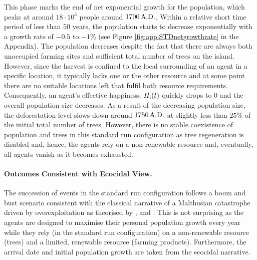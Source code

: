 This phase marks the end of net exponential growth for the population, which peaks at around $18\cdot 10^3$ people around $1700\, {\rm A.D.}$.
Within a relative short time period of less than $50$ years, the population starts to decrease exponentially with a growth rate of $-0.5$ to $-1\%$ (see Figure \ref{fig:app:STDnetgrowthrate} in the Appendix).
The population decreases despite the fact that there are always both unoccupied farming sites and sufficient total number of trees on the island.
However, since the harvest is confined to the local surrounding of an agent in a specific location, it typically lacks one or the other resource and at some point there are no suitable locations left that fulfil both resource requirements.
Consequently, an agent's effective happiness, $H_{\rm i}(t)$ quickly drops to $0$ and the overall population size decreases.
As a result of the decreasing population size, the deforestation level slows down around $1750\, {\rm A.D.}$ at slightly less than $25\%$ of the initial total number of trees. 
However, there is no stable coexistence of population and trees in this standard run configuration as tree regeneration is disabled and, hence, the agents rely on a non-renewable resource and, eventually, all agents vanish as it becomes exhausted.


\paragraph{Outcomes Consistent with Ecocidal View.}
The succession of events in the standard run configuration follows a boom and bust scenario consistent with the classical narrative of a Malthusian catastrophe driven by overexploitation as theorised by \citet{Brander1998}, \citet{Diamond2011} and \citet{Bahn2017}.
This is not surprising as the agents are designed to maximise their personal population growth every year while they rely (in the standard run configuration) on a non-renewable resource (trees) and a limited, renewable resource (farming products).
Furthermore, the arrival date and initial population growth are taken from the ecocidal narrative.


